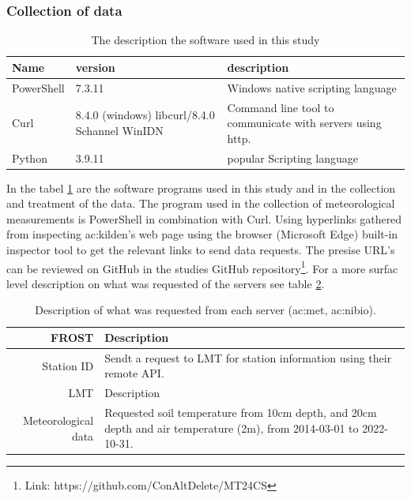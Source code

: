 \subsubsection{Collection of data}

\begin{table}
	\centering
	\begin{tabular}{l|p{3cm}|p{3cm}}
		Name       &version&                       description                        \\ \hline
		PowerShell &7.3.11 & Windows native scripting language \\\hline
		Curl       & 8.4.0 (windows) libcurl/8.4.0 Schannel WinIDN & Command line tool to communicate with servers using http. \\\hline
		Python     &                    3.9.11                     &                popular Scripting language
	\end{tabular}
	\caption[software version description]{The description the software used in this study}
	\label{tab:software}
\end{table}

In the tabel \ref{tab:software} are the software programs used in this study and in the collection and treatment of the data. The program used in the collection of meteorological measurements is PowerShell in combination with Curl. Using hyperlinks gathered from inspecting \acrshort{ac:kilden}'s web page using the browser (Microsoft Edge) built-in inspector tool to get the relevant links to send data requests. The presise URL's can be reviewed on GitHub in the studies GitHub repository\footnote{Link: https://github.com/ConAltDelete/MT24CS}. For a more surfac level description on what was requested of the servers see table \ref{tab:station_request}.

\begin{table}
	\centering
	\begin{tabular}{r|p{5cm}|}
		FROST & Description\\ \hline
		Station ID & Sendt a request to LMT for station information using their remote API.\\
		 \hline LMT & Description\\ \hline
		Meteorological data & Requested soil temperature from 10cm depth, and 20cm depth and air temperature (2m), from 2014-03-01 to 2022-10-31.
	\end{tabular}
	\caption[Request to servers about stations]{Description of what was requested from each server (\acrshort{ac:met}, \acrshort{ac:nibio}).}
	\label{tab:station_request}
\end{table}

